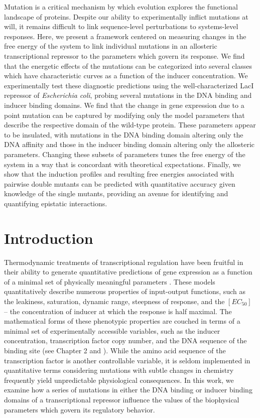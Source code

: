 \documentclass[12pt]{caltech_thesis}
\begin{document}
Mutation is a critical mechanism by which evolution explores the
functional landscape of proteins. Despite our ability to experimentally
inflict mutations at will, it remains difficult to link sequence-level
perturbations to systems-level responses. Here, we present a framework
centered on measuring changes in the free energy of the system to link
individual mutations in an allosteric transcriptional repressor to the
parameters which govern its response. We find that the energetic effects
of the mutations can be categorized into several classes which have
characteristic curves as a function of the inducer concentration. We
experimentally test these diagnostic predictions using the
well-characterized LacI repressor of \emph{Escherichia coli}, probing
several mutations in the DNA binding and inducer binding domains. We
find that the change in gene expression due to a point mutation can be
captured by modifying only the model parameters that describe the
respective domain of the wild-type protein. These parameters appear to
be insulated, with mutations in the DNA binding domain altering only the
DNA affinity and those in the inducer binding domain altering only the
allosteric parameters. Changing these subsets of parameters tunes the
free energy of the system in a way that is concordant with theoretical
expectations. Finally, we show that the induction profiles and resulting
free energies associated with pairwise double mutants can be predicted
with quantitative accuracy given knowledge of the single mutants,
providing an avenue for identifying and quantifying epistatic
interactions.

\hypertarget{introduction-2}{%
\section{Introduction}\label{introduction-2}}

Thermodynamic treatments of transcriptional regulation have been
fruitful in their ability to generate quantitative predictions of gene
expression as a function of a minimal set of physically meaningful
parameters
\autocite{ackers1982,buchler2003,vilar2003,garcia2011,daber2009a,brewster2014,weinert2014,rydenfelt2014b,razo-mejia2014,razo-mejia2018,bintu2005,bintu2005a,kuhlman2007}.
These models quantitatively describe numerous properties of input-output
functions, such as the leakiness, saturation, dynamic range, steepness
of response, and the \([EC_{50}]\) -- the concentration of inducer at
which the response is half maximal. The mathematical forms of these
phenotypic properties are couched in terms of a minimal set of
experimentally accessible variables, such as the inducer concentration,
transcription factor copy number, and the DNA sequence of the binding
site (see Chapter 2 and \textcite{razo-mejia2018}). While the amino acid
sequence of the transcription factor is another controllable variable,
it is seldom implemented in quantitative terms considering mutations
with subtle changes in chemistry frequently yield unpredictable
physiological consequences. In this work, we examine how a series of
mutations in either the DNA binding or inducer binding domains of a
transcriptional repressor influence the values of the biophysical
parameters which govern its regulatory behavior.
\end{document}

